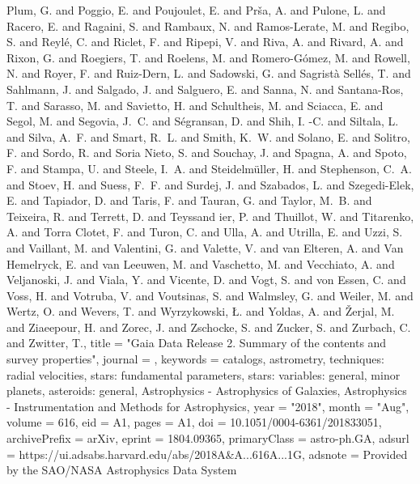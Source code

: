 \documentclass[a4paper,fleqn,usenatbib]{mnras}
\begin{document}
{{         {Plum}, G. and {Poggio}, E. and {Poujoulet}, E. and {Pr{\v{s}}a}, A. and
         {Pulone}, L. and {Racero}, E. and {Ragaini}, S. and {Rambaux}, N. and
         {Ramos-Lerate}, M. and {Regibo}, S. and {Reyl{\'e}}, C. and
         {Riclet}, F. and {Ripepi}, V. and {Riva}, A. and {Rivard}, A. and
         {Rixon}, G. and {Roegiers}, T. and {Roelens}, M. and
         {Romero-G{\'o}mez}, M. and {Rowell}, N. and {Royer}, F. and
         {Ruiz-Dern}, L. and {Sadowski}, G. and {Sagrist{\`a} Sell{\'e}s}, T. and
         {Sahlmann}, J. and {Salgado}, J. and {Salguero}, E. and {Sanna}, N. and
         {Santana-Ros}, T. and {Sarasso}, M. and {Savietto}, H. and
         {Schultheis}, M. and {Sciacca}, E. and {Segol}, M. and
         {Segovia}, J.~C. and {S{\'e}gransan}, D. and {Shih}, I. -C. and
         {Siltala}, L. and {Silva}, A.~F. and {Smart}, R.~L. and {Smith}, K.~W. and
         {Solano}, E. and {Solitro}, F. and {Sordo}, R. and {Soria Nieto}, S. and
         {Souchay}, J. and {Spagna}, A. and {Spoto}, F. and {Stampa}, U. and
         {Steele}, I.~A. and {Steidelm{\"u}ller}, H. and {Stephenson}, C.~A. and
         {Stoev}, H. and {Suess}, F.~F. and {Surdej}, J. and {Szabados}, L. and
         {Szegedi-Elek}, E. and {Tapiador}, D. and {Taris}, F. and {Tauran}, G. and
         {Taylor}, M.~B. and {Teixeira}, R. and {Terrett}, D. and {Teyssand
        ier}, P. and {Thuillot}, W. and {Titarenko}, A. and {Torra Clotet}, F. and
         {Turon}, C. and {Ulla}, A. and {Utrilla}, E. and {Uzzi}, S. and
         {Vaillant}, M. and {Valentini}, G. and {Valette}, V. and
         {van Elteren}, A. and {Van Hemelryck}, E. and {van Leeuwen}, M. and
         {Vaschetto}, M. and {Vecchiato}, A. and {Veljanoski}, J. and
         {Viala}, Y. and {Vicente}, D. and {Vogt}, S. and {von Essen}, C. and
         {Voss}, H. and {Votruba}, V. and {Voutsinas}, S. and {Walmsley}, G. and
         {Weiler}, M. and {Wertz}, O. and {Wevers}, T. and {Wyrzykowski}, {\L}. and
         {Yoldas}, A. and {{\v{Z}}erjal}, M. and {Ziaeepour}, H. and
         {Zorec}, J. and {Zschocke}, S. and {Zucker}, S. and {Zurbach}, C. and
         {Zwitter}, T.},
        title = "{Gaia Data Release 2. Summary of the contents and survey properties}",
      journal = {\aap},
     keywords = {catalogs, astrometry, techniques: radial velocities, stars: fundamental parameters, stars: variables: general, minor planets, asteroids: general, Astrophysics - Astrophysics of Galaxies, Astrophysics - Instrumentation and Methods for Astrophysics},
         year = "2018",
        month = "Aug",
       volume = {616},
       eid = {A1},
        pages = {A1},
          doi = {10.1051/0004-6361/201833051},
archivePrefix = {arXiv},
       eprint = {1804.09365},
 primaryClass = {astro-ph.GA},
       adsurl = {https://ui.adsabs.harvard.edu/abs/2018A&A...616A...1G},
      adsnote = {Provided by the SAO/NASA Astrophysics Data System}
}
\end{document}
